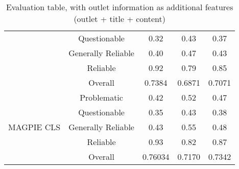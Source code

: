 \begin{table}[htbp]
\begin{tabular}{| c | c | c | c | c |}
                                                 & Questionable       & 0.32      & 0.43   & 0.37   \\
                                                 & Generally Reliable & 0.40      & 0.47   & 0.43   \\
                                                 & Reliable           & 0.92      & 0.79   & 0.85   \\
                                                 & Overall            & 0.7384    & 0.6871 & 0.7071 \\
        \hline
        \multirow{5}{*}{MAGPIE CLS}              & Problematic        & 0.42      & 0.52   & 0.47   \\
                                                 & Questionable       & 0.35      & 0.43   & 0.38   \\
                                                 & Generally Reliable & 0.43      & 0.55   & 0.48   \\
                                                 & Reliable           & 0.93      & 0.82   & 0.87   \\
                                                 & Overall            & 0.76034   & 0.7170 & 0.7342 \\
        \hline
    \end{tabular}
    \caption{Evaluation table, with outlet information as additional features (outlet + title + content)}
    \label{table:eval-outlet}
\end{table}


